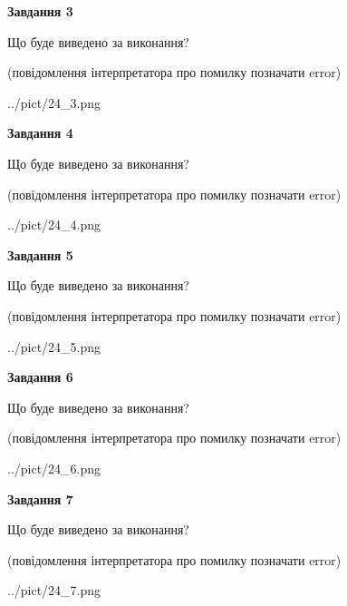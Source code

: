 \documentclass[12pt, ukrainian]{article}
\begin{document}
{\begin {large}
{\begin {center}\textbf{Завдання 3}\end {center}}\par
Що буде виведено за виконання?\par
 (повідомлення інтерпретатора про помилку позначати error)\par
\begin{center}
	{../pict/24_3.png}
\end{center}
\newpage

{\begin {center}\textbf{Завдання 4}\end {center}}\par
Що буде виведено за виконання?\par
 (повідомлення інтерпретатора про помилку позначати error)\par
\begin{center}
	{../pict/24_4.png}
\end{center}
\newpage

{\begin {center}\textbf{Завдання 5}\end {center}}\par
Що буде виведено за виконання?\par
 (повідомлення інтерпретатора про помилку позначати error)\par
\begin{center}
	{../pict/24_5.png}
\end{center}
\newpage

{\begin {center}\textbf{Завдання 6}\end {center}}\par
Що буде виведено за виконання?\par
 (повідомлення інтерпретатора про помилку позначати error)\par
\begin{center}
	{../pict/24_6.png}
\end{center}
\newpage

{\begin {center}\textbf{Завдання 7}\end {center}}\par
Що буде виведено за виконання?\par
 (повідомлення інтерпретатора про помилку позначати error)\par
\begin{center}
	{../pict/24_7.png}
\end{center}
\newpage


\end{large}}
\end{document}
